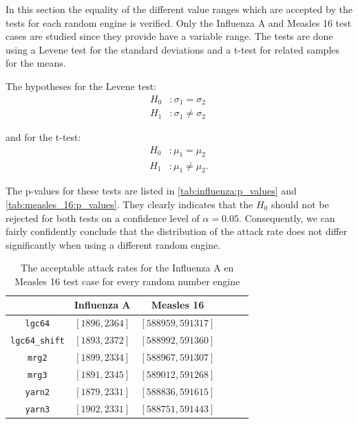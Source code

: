 \documentclass{acmart}
\begin{document}
In this section the equality of the different value ranges which are accepted by the tests for each random engine is verified. Only the Influenza A and Measles 16 test cases are studied since they provide have a variable range. The tests are done using a Levene test for the standard deviations and a t-test for related samples for the means.

The hypotheses for the Levene test:
\[
\begin{aligned}
 H_0 &: \sigma_1 = \sigma_2\\
 H_1 &: \sigma_1 \ne \sigma_2\
\end{aligned}
\]

and for the t-test:
\[
\begin{aligned}
 H_0 &: \mu_1 = \mu_2  \\
 H_1 &: \mu_1 \ne \mu_2.
\end{aligned}
\]

The p-values for these tests are listed in \cref{tab:influenza:p_values} and \cref{tab:measles_16:p_values}. They clearly indicates that the \(H_0\) should not be rejected for both tests on a confidence level of $\alpha = 0.05$. Consequently, we can fairly confidently conclude that the distribution of the attack rate does not differ significantly when using a different random engine.


\begin{table}[!hbt]
    \centering
    \bgroup
    \def\arraystretch{2}
    \begin{tabular}{c|c|c|c|c|c}
                                & \textbf{Influenza A}  & \textbf{Measles 16} \\ \hline
        \texttt{lgc64}          & \([1896, 2364]\)       & \([588959, 591317]\) \\
        \texttt{lgc64\_shift}   & \([1893, 2372]\)       & \([588992, 591360]\) \\
        \texttt{mrg2}           & \([1899, 2334]\)       & \([588967, 591307]\) \\
        \texttt{mrg3}           & \([1891, 2345]\)       & \([589012, 591268]\) \\
        \texttt{yarn2}          & \([1879, 2331]\)       & \([588836, 591615]\) \\
        \texttt{yarn3}          & \([1902, 2331]\)       & \([588751, 591443]\) \\
    \end{tabular}
    \egroup
    \caption{The acceptable attack rates for the Influenza A en Measles 16 test case for every random number engine}
    \label{tab:ranges_engines}
\end{table}
\end{document}
